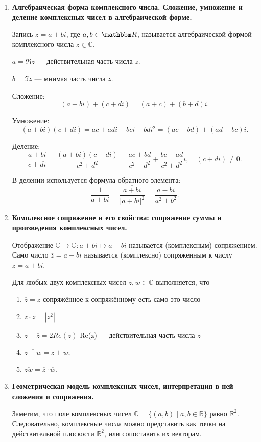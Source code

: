\begin{enumerate}
\item \textbf{Алгебраическая форма комплексного числа. Сложение, умножение и деление комплексных чисел в алгебраической форме.}

Запись $z = a + bi$, где $a, b \in \R$, называется алгебраической формой комплексного числа $z \in \mathbb{C}$.

$a = \Re z$ — действительная часть числа $z$.

$b = \Im z$ — мнимая часть числа $z$.

Сложение: $$ (a + bi) + (c + di) = (a + c) + (b + d)i.$$

Умножение: $$(a + bi)(c + di) = ac + adi + bci + bdi^2 = (ac - bd) + (ad + bc)i.$$

Деление: $$\frac{a + bi}{c + di} = \frac{(a + bi)(c - di)}{c^2 + d^2} = \frac{ac + bd}{c^2 + d^2} + \frac{bc - ad}{c^2 + d^2}i, \quad (c + di) \neq 0.$$

В делении используется формула обратного элемента:
$$
\frac{1}{a + bi} = \frac{\overline{a + bi}}{|a + bi|^2} = \frac{a - bi}{a^2 + b^2}.
$$

\item \textbf{Комплексное сопряжение и его свойства: сопряжение суммы и произведения комплексных чисел.}

Отображение $\mathbb{C} \rightarrow \mathbb{C} : a + bi \mapsto a - bi$ называется (комплексным) сопряжением. Само число $\overline{z} = a - bi$ называется (комплексно) сопряженным к числу $z = a + bi$. 

Для любых двух комплексных чисел $z, w \in \mathbb{C}$ выполняется, что
\begin{enumerate}
\item $\overline{\overline{z}} = z$ сопряжённое к сопряжённому есть само это число
\item $z \cdot \overline{z} = |z^2|$ 
\item $z + \overline{z} = 2Re(z)$ Re(z) --- действительная часть числа $z$
\item $\overline{z + w} = \overline{z} + \overline{w}$;
\item $\overline{zw} = \overline{z} \cdot \overline{w}$.
\end{enumerate}

\item \textbf{Геометрическая модель комплексных чисел, интерпретация в ней сложения и сопряжения.}

Заметим, что поле комплексных чисел $\mathbb{C} = \{(a, b) \mid a, b \in \mathbb{R}\}$ равно $\mathbb{R}^2$. Следовательно, комплексные числа можно представить как точки на действительной плоскости $\mathbb{R}^2$, или сопоставить их векторам.


\end{enumerate}
